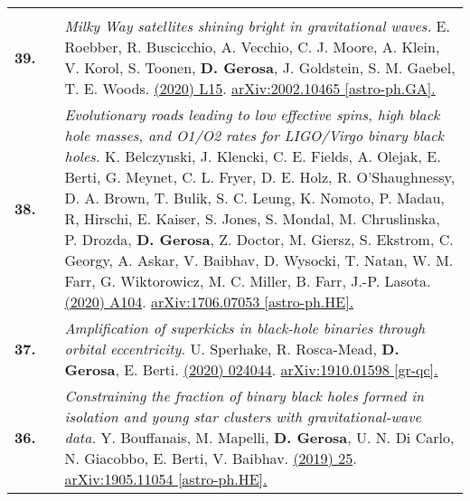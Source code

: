 {\begin{longtable}{rp{0.3cm}p{15.8cm}}
\vspace{0.09cm}\\
%
\textbf{39.} & & \textit{Milky Way satellites shining bright in gravitational waves.}
\newline{}
E. Roebber, R. Buscicchio, A. Vecchio, C. J. Moore, A. Klein, V. Korol, S. Toonen, \textbf{D. Gerosa}, J. Goldstein, S. M. Gaebel, T. E. Woods.
\newline{}
\href{https://iopscience.iop.org/article/10.3847/2041-8213/ab8ac9}{\apjl 894 (2020) L15}. \href{https://arxiv.org/abs/2002.10465}{arXiv:2002.10465 [astro-ph.GA].}
\vspace{0.09cm}\\
%
\textbf{38.} & & \textit{Evolutionary roads leading to low effective spins, high black hole masses, and O1/O2 rates for LIGO/Virgo binary black holes.}
\newline{}
K. Belczynski, J. Klencki, C. E. Fields, A. Olejak, E. Berti, G. Meynet, C. L. Fryer, D. E. Holz, R. O'Shaughnessy, D. A. Brown, T. Bulik, S. C. Leung,  K. Nomoto, P. Madau, R, Hirschi, E. Kaiser, S. Jones, S. Mondal, M. Chruslinska, P. Drozda, \textbf{D. Gerosa}, Z. Doctor, M. Giersz, S. Ekstr\:om, C. Georgy, A. Askar, V. Baibhav, D. Wysocki, T. Natan, W. M. Farr, G. Wiktorowicz, M. C. Miller, B. Farr, J.-P. Lasota.
\newline{}
\href{https://www.aanda.org/articles/aa/full_html/2020/04/aa36528-19/aa36528-19.html}{\aap 636 (2020) A104}. \href{https://arxiv.org/abs/1706.07053}{arXiv:1706.07053 [astro-ph.HE].}
\vspace{0.09cm}\\
%
\textbf{37.} & & \textit{Amplification of superkicks in black-hole binaries through orbital eccentricity.}
\newline{}
U. Sperhake, R. Rosca-Mead, \textbf{D. Gerosa}, E. Berti.
\newline{}
\href{https://journals.aps.org/prd/abstract/10.1103/PhysRevD.101.024044}{\prd 101 (2020) 024044}. \href{https://arxiv.org/abs/1910.01598}{arXiv:1910.01598 [gr-qc].}
\vspace{0.09cm}\\
%
\textbf{36.} & & \textit{Constraining the fraction of binary black holes formed in isolation and young star clusters with gravitational-wave data.}
\newline{}
Y. Bouffanais, M. Mapelli, \textbf{D. Gerosa}, U. N. Di Carlo, N. Giacobbo, E. Berti, V. Baibhav.
\newline{}
\href{https://iopscience.iop.org/article/10.3847/1538-4357/ab4a79}{\apj 886 (2019) 25}. \href{https://arxiv.org/abs/1905.11054}{arXiv:1905.11054 [astro-ph.HE].}

\end{longtable}}
